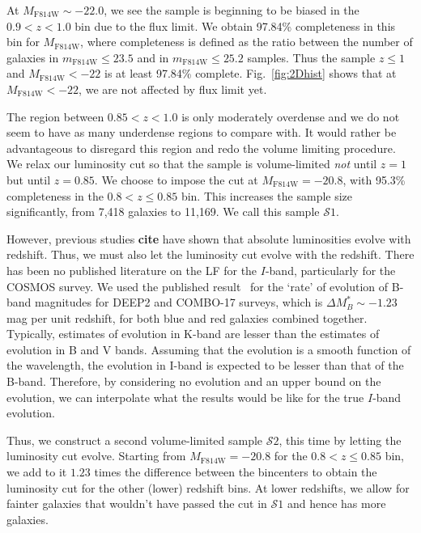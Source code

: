 \documentclass[twocolumn,useAMS,usenatbib]{mn2e}
\newcommand{\s}{\ensuremath{\mathcal{S}}}
\begin{document}
At $M_\text{F814W}\sim-22.0$, we see the sample is beginning to be biased in the $0.9<z<1.0$ bin due to the flux limit. We obtain 97.84\% completeness in this bin for $M_\text{F814W}$, where completeness is defined as the ratio between the number of galaxies in $m_\text{F814W}\le 23.5$ and in $m_\text{F814W}\le25.2$ samples.
Thus the sample $z\le1$ and $M_\text{F814W}<-22$ is at least 97.84\% complete. Fig.~\ref{fig:2Dhist} shows that at $M_\text{F814W}<-22$, we are not affected by flux limit yet. 

The region between $0.85<z<1.0$ is only moderately overdense and we do not seem to have as many underdense regions to compare with. It would rather be advantageous to disregard this region
and redo the volume limiting procedure.
We relax our luminosity cut %
so that the sample is volume-limited \emph{not} until $z=1$ but until $z=0.85$. 
We choose to impose the cut at $M_\text{F814W}=-20.8$, with 95.3\% completeness in the $0.8 < z \le 0.85$ bin. This increases the sample size significantly, from 7,418 galaxies to 11,169. We call this sample \s$1$.

However, previous studies {\bf cite} have shown that absolute luminosities evolve with redshift. Thus, we must also let the luminosity cut evolve with the redshift. 
There has been no published literature on the LF for the $I$-band, particularly for the COSMOS survey.
We used the published result~\citep{Faber2007} for the `rate' of evolution of B-band magnitudes for DEEP2 and COMBO-17 surveys, which is $ \Delta M_B^* \sim -1.23$ mag per unit redshift, for both blue and red galaxies combined together.
Typically, estimates of evolution in K-band are lesser than the estimates of evolution in B and V bands.
Assuming that the evolution is a smooth function of the wavelength, the evolution in I-band is expected to be lesser than that of the B-band. 
Therefore, by considering no evolution and an upper bound on the evolution, we can interpolate what the results would be like for the true $I$-band evolution.

Thus, we construct a second volume-limited sample \s$2$, this time by letting the luminosity cut evolve. Starting from $M_\text{F814W} = -20.8$ for the $0.8<z\le0.85$ bin, we add to it $1.23$ times the difference between the
bincenters to obtain the luminosity cut for the other (lower) redshift bins. At lower redshifts, we allow for fainter galaxies that wouldn't have passed the cut in \s$1$ and hence has more galaxies.
\end{document}
